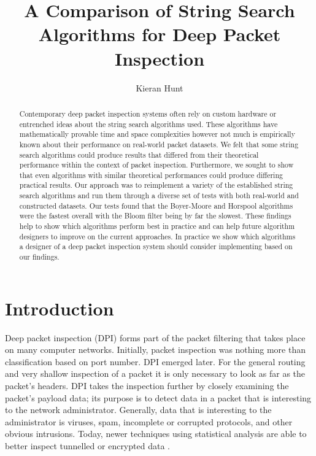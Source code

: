 \documentclass{article}
\begin{document}
\title{A Comparison of String Search Algorithms for Deep Packet Inspection}
\author{Kieran Hunt}

\maketitle

\begin{abstract}
Contemporary deep packet inspection systems often rely on custom hardware or entrenched ideas about the string search algorithms used. These algorithms have mathematically provable time and space complexities however not much is empirically known about their performance on real-world packet datasets. We felt that some string search algorithms could produce results that differed from their theoretical performance within the context of packet inspection. Furthermore, we sought to show that even algorithms with similar theoretical performances could produce differing practical results. Our approach was to reimplement a variety of the established string search algorithms and run them through a diverse set of tests with both real-world and constructed datasets. Our tests found that the Boyer-Moore and Horspool algorithms were the fastest overall with the Bloom filter being by far the slowest. These findings help to show which algorithms perform best in practice and can help future algorithm designers to improve on the current approaches. In practice we show which algorithms a designer of a deep packet inspection system should consider implementing based on our findings.
\end{abstract}

\tableofcontents

\section{Introduction}

Deep packet inspection (DPI) forms part of the packet filtering that takes place on many computer networks. Initially, packet inspection was nothing more than classification based on port number. DPI emerged later. For the general routing and very shallow inspection of a packet it is only necessary to look as far as the packet's headers. DPI takes the inspection further by closely examining the packet's payload data; its purpose is to detect data in a packet that is interesting to the network administrator. Generally, data that is interesting to the administrator is viruses, spam, incomplete or corrupted protocols, and other obvious intrusions. Today, newer techniques using statistical analysis are able to better inspect tunnelled or encrypted data \citep{Cascarano2011}.
\end{document}
